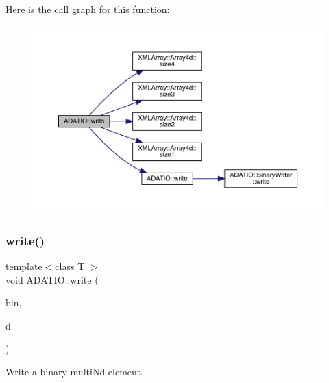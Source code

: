 Here is the call graph for this function\+:
\nopagebreak
\begin{figure}[H]
\begin{center}
\leavevmode
\includegraphics[width=350pt]{d0/dba/namespaceADATIO_ad3c579901108d678f21ec1a97d0ab197_cgraph}
\end{center}
\end{figure}
\mbox{\label{namespaceADATIO_a0f804d3b56353fad83984a5668212660}} 
\subsubsection{\texorpdfstring{write()}{write()}\hspace{0.1cm}{\footnotesize\ttfamily [20/25]}}
{\footnotesize\ttfamily template$<$class T $>$ \\
void A\+D\+A\+T\+I\+O\+::write (\begin{DoxyParamCaption}\item[{\mbox{\hyperlink{classADATIO_1_1BinaryWriter}{Binary\+Writer}} \&}]{bin,  }\item[{const \mbox{\hyperlink{classADAT_1_1ArrayNd}{A\+D\+A\+T\+::\+Array\+Nd}}$<$ T $>$ \&}]{d }\end{DoxyParamCaption})\hspace{0.3cm}{\ttfamily [inline]}}



Write a binary multi\+Nd element. 

